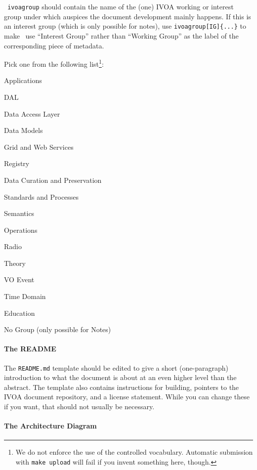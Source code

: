 \documentclass[11pt,a4paper]{ivoa}
\newcommand{\texword}[1]{\texttt{\color{texcolor} #1}}
\begin{document}
\texword{ivoagroup} should contain the name of the (one) IVOA working or
interest group under which auspices the document development mainly
happens.  If this is an interest group (which is only possible for
notes), use \verb|ivoagroup[IG]{...}| to make \ivoatex~use ``Interest
Group'' rather than ``Working Group'' as the label of the corresponding
piece of metadata.

Pick one from the following list\footnote{We do not
enforce the use of the controlled vocabulary.  Automatic submission
with \texttt{make upload} will fail if you invent something here,
though.}:

\begin{compactitem}
\item Applications
\item DAL
\item Data Access Layer
\item Data Models
\item Grid and Web Services
\item Registry
\item Data Curation and Preservation
\item Standards and Processes
\item Semantics
\item Operations
\item Radio
\item Theory
\item VO Event
\item Time Domain
\item Education
\item No Group (only possible for Notes)
\end{compactitem}

\paragraph{The README}

The \verb|README.md| template should be edited to give a short
(one-paragraph) introduction to what the document is about at an even
higher level than the abstract.  The template also contains instructions
for building, pointers to the IVOA document repository, and a license
statement.  While you can change these if you want, that should not
usually be necessary.


\paragraph{The Architecture Diagram}
\label{sect:archdiag}
\end{document}
